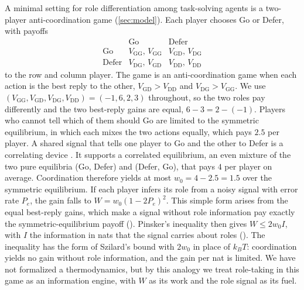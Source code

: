 \documentclass[
  aps,prx,
  reprint,
  superscriptaddress,
  nofootinbib,
  longbibliography
]{revtex4-2}
\newcommand{\smref}[1]{\cite[Sec.~#1]{SM}}
\begin{document}
A minimal setting for role differentiation among task-solving agents is a two-player anti-coordination game (\cref{sec:model}). Each player chooses Go or Defer, with payoffs
\begin{equation*}
\begin{array}{r|cc}
 & \text{Go} & \text{Defer}\\\hline
\text{Go} & V_{\mathrm{GG}},\,V_{\mathrm{GG}} & V_{\mathrm{GD}},\,V_{\mathrm{DG}}\\
\text{Defer} & V_{\mathrm{DG}},\,V_{\mathrm{GD}} & V_{\mathrm{DD}},\,V_{\mathrm{DD}}
\end{array}
\end{equation*}
to the row and column player. The game is an anti-coordination game when each action is the best reply to the other, $V_{\mathrm{GD}}>V_{\mathrm{DD}}$ and $V_{\mathrm{DG}}>V_{\mathrm{GG}}$. We use $(V_{\mathrm{GG}},V_{\mathrm{GD}},V_{\mathrm{DG}},V_{\mathrm{DD}})=(-1,6,2,3)$ throughout, so the two roles pay differently and the two best-reply gains are equal, $6-3=2-(-1)$. Players who cannot tell which of them should Go are limited to the symmetric equilibrium, in which each mixes the two actions equally, which pays $2.5$ per player. A shared signal that tells one player to Go and the other to Defer is a correlating device \cite{aumann1974,aumann1987}. It supports a correlated equilibrium, an even mixture of the two pure equilibria (Go, Defer) and (Defer, Go), that pays $4$ per player on average. Coordination therefore yields at most $w_0=4-2.5=1.5$ over the symmetric equilibrium. If each player infers its role from a noisy signal with error rate $P_e$, the gain falls to $W=w_0(1-2P_e)^2$. This simple form arises from the equal best-reply gains, which make a signal without role information pay exactly the symmetric-equilibrium payoff (\smref{S1\,B}). Pinsker's inequality then gives $W\le2w_0I$, with $I$ the information in nats that the signal carries about roles (\smref{S1\,A}). The inequality has the form of Szilard's bound with $2w_0$ in place of $k_BT$: coordination yields no gain without role information, and the gain per nat is limited. We have not formalized a thermodynamics, but by this analogy we treat role-taking in this game as an information engine, with $W$ as its work and the role signal as its fuel.
\end{document}
